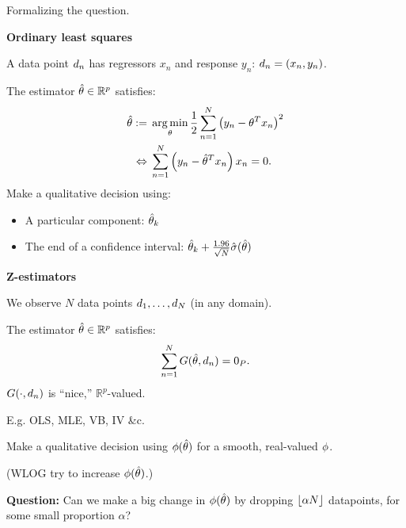 

\begin{frame}[t]{Formalizing the question.}

\begin{minipage}[t]{0.45\textwidth}
\textbf{Ordinary least squares}

A data point $d_n$ has regressors
$x_n$ and response $y_n$: $d_n = (x_n, y_n)$.

\vspace{1em}
The estimator $\hat{\theta} \in \mathbb{R}^p$ satisfies:
%
\begin{align*}
%
\thetahat :={}&
    \argmin_{\theta} \frac{1}{2} \sumn \left(y_n - \theta^T x_n \right)^{2} \\
\Leftrightarrow{}& \sumn \left(y_n - \thetahat^T x_n \right) x_n = 0.
%
\end{align*}
%
Make a qualitative decision using:\vspace{-1.5em}
\begin{itemize}
\item A particular component: $\hat{\theta}_k$
\item The end of a confidence interval:
    $\hat{\theta}_k + \frac{1.96}{\sqrt{N}} \hat\sigma(\hat{\theta})$
\end{itemize}
%
\end{minipage}
%
\hfill\vline\hfill
%
\begin{minipage}[t]{0.45\textwidth}
\textbf{Z-estimators}

We observe $N$ data points $d_{1}, \ldots, d_{N}$
(in any domain).

\vspace{1em}
The estimator $\hat{\theta} \in \mathbb{R}^p$ satisfies:
%
\begin{align*}
%
\sumn
G(\thetahat, \d_{n}) =  \zP.
%
\end{align*}
%
$G(\cdot, d_{n})$ is ``nice,'' $\mathbb{R}^p$-valued.

E.g. OLS, MLE, VB, IV \&c.

\vspace{1em}
Make a qualitative decision using $\phi(\hat{\theta})$
for a smooth, real-valued $\phi$.

\vspace{1em}
(WLOG try to increase $\phi(\hat{\theta})$.)
%
\end{minipage}

\hrulefill

\vspace{0.3em}
\textbf{Question: }
Can we make a big change in $\phi(\hat{\theta})$ by dropping
$\lfloor \alpha N \rfloor$ datapoints, for some small proportion $\alpha$?



\end{frame}





